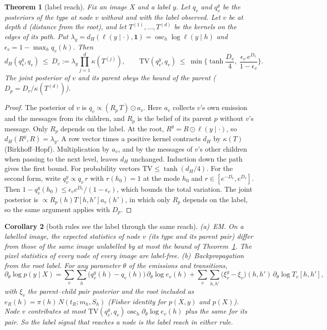\documentclass[11pt]{article}
\newtheorem{theorem}{Theorem}
\newtheorem{corollary}[theorem]{Corollary}
\theoremstyle{definition}
\begin{document}
\begin{theorem}[label reach]\label{thm:reach}
Fix an image $X$ and a label $y$. Let $q_v$ and $q^y_v$ be the posteriors of the type at node $v$ without and
with the label observed. Let $v$ be at depth $d$ (distance from the root), and let $T^{(1)},\dots,T^{(d)}$ be the
kernels on the edges of its path. Put $\lambda_y=d_H(\ell(y\mid\cdot),\mathbf 1)=\operatorname{osc}_h\log\ell(y\mid h)$
and $\epsilon_v=1-\max_hq_v(h)$. Then
\[
d_H(q^y_v,q_v)\ \le\ D_v:=\lambda_y\prod_{j=1}^d\kappa(T^{(j)}),\qquad
\mathrm{TV}(q^y_v,q_v)\ \le\ \min\Big\{\tanh\frac{D_v}4,\ \frac{\epsilon_v\,e^{D_v}}{1-\epsilon_v}\Big\}.
\]
The joint posterior of $v$ and its parent obeys the bound of the parent ($D_p=D_v/\kappa(T^{(d)})$).
\end{theorem}
\begin{proof}
The posterior of $v$ is $q_v\propto(R_p\,T)\odot a_v$. Here $a_v$ collects $v$'s own emission and the messages
from its children, and $R_p$ is the belief of its parent $p$ without $v$'s message. Only $R_p$ depends on
the label. At the root, $R^y=R\odot\ell(y\mid\cdot)$, so $d_H(R^y,R)=\lambda_y$. A row vector times a positive
kernel contracts $d_H$ by $\kappa(T)$ (Birkhoff--Hopf). Multiplication by $a_v$, and by the messages of $v$'s
other children when passing to the next level, leaves $d_H$ unchanged. Induction down the path gives the
first bound. For probability vectors $\mathrm{TV}\le\tanh(d_H/4)$. For the second form, write
$q^y_v\propto q_v\,r$ with $r(h_0)=1$ at the mode $h_0$ and $r\in[e^{-D_v},e^{D_v}]$. Then
$1-q^y_v(h_0)\le\epsilon_ve^{D_v}/(1-\epsilon_v)$, which bounds the total variation. The joint posterior is
$\propto R_p(h)T[h,h']a_v(h')$, in which only $R_p$ depends on the label, so the same argument applies with $D_p$.
\end{proof}

\begin{corollary}[both rules see the label through the same reach]\label{cor:reach}
(a)~\emph{EM.} On a labelled image, the expected statistics of node $v$ (its type and its parent pair) differ
from those of the same image unlabelled by at most the bound of Theorem~\ref{thm:reach}. The pixel statistics
of every node of every image are label-free.
(b)~\emph{Backpropagation from the root label.} For any parameter $\theta$ of the emissions and transitions,
\[
\partial_\theta\log p(y\mid X)=\sum_v\sum_h\big(q^y_v(h)-q_v(h)\big)\,\partial_\theta\log e_v(h)
+\sum_v\sum_{h,h'}\big(\xi^y_v-\xi_v\big)(h,h')\,\partial_\theta\log T_v[h,h'] ,
\]
with $\xi_v$ the parent--child pair posterior and the root included as $e_R(h)=\pi(h)\,N(t_R;m_h,S_h)$ (Fisher
identity for $p(X,y)$ and $p(X)$). Node $v$ contributes
at most $\mathrm{TV}(q^y_v,q_v)\operatorname{osc}_h\partial_\theta\log e_v(h)$ plus the same for its pair. So
the label signal that reaches a node is the label reach in either rule.
\end{corollary}
\end{document}

